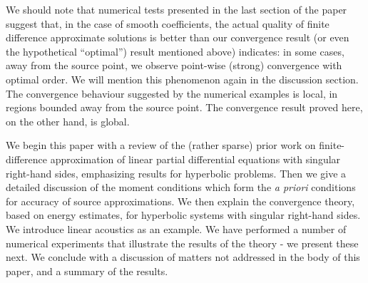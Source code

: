 We should note that numerical tests presented in the last section of
the paper suggest that, in the case of smooth coefficients, the actual 
quality of finite difference approximate solutions is better than our 
convergence result (or even the hypothetical ``optimal'') result
mentioned above) indicates: in some cases, away from the source 
point, we observe point-wise (strong) convergence with optimal 
order. We will mention this phenomenon again in the discussion 
section. The convergence behaviour suggested by the numerical examples 
is local, in regions bounded away from the source point. The 
convergence result proved here, on the other hand, is global.

We begin this paper with a review of the (rather sparse) prior work on
finite-difference approximation of linear partial differential 
equations with singular right-hand sides, emphasizing results for 
hyperbolic problems. Then we give a detailed discussion of the moment conditions which form the {\em a priori} conditions for accuracy of 
source approximations. We then explain the convergence theory, based 
on energy estimates, for hyperbolic systems with singular right-hand 
sides. We introduce linear acoustics as an example. We have performed 
a number of numerical experiments that illustrate the results of the 
theory - we present these next. We conclude with a discussion of
matters not addressed in the body of this paper, and a summary of the 
results. 





